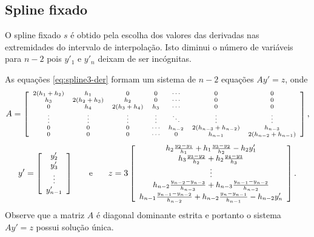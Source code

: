\subsection{Spline fixado}

O spline fixado $s$ é obtido pela escolha dos valores das derivadas nas extremidades do intervalo de interpolação. Isto diminui o número de variáveis para $n-2$ pois $y'_1$ e $y'_n$ deixam de ser incógnitas.

As equações \eqref{eq:spline3-der} formam um sistema de $n-2$ equações $Ay' = z$, onde
\begin{equation*}
	\begin{scriptsize}
A=\left[\begin{array}{ccccccc}
2(h_1+h_2)&h_1&0&0 &\cdots&0&0\\
h_3&2(h_2+h_3)&h_2&0&\cdots&0&0\\
0&h_4&2(h_3+h_4)&h_3&\cdots&0&0\\
\vdots&\vdots&\vdots&\vdots&\ddots&\vdots&\vdots\\
0&0&0&\cdots&h_{n-2} & 2(h_{n-3}+h_{n-2})&h_{n-3}\\
0&0&0&\cdots &0&h_{n-1}&2(h_{n-2}+h_{n-1})
\end{array}\right],
\end{scriptsize} 
\end{equation*}
\begin{equation*}
	\begin{small}
y'= \left[\begin{array}{c}
y'_2\\
y'_3\\
\vdots\\
y'_{n-1}
\end{array}\right]\qquad \text{e}\qquad
z = 3\left[\begin{array}{c}
	h_2\frac{y_2-y_1}{h_1}+h_1\frac{y_3-y_2}{h_2}-h_2y'_1\\
	h_3\frac{y_3-y_2}{h_2}+h_2\frac{y_4-y_3}{h_3}\\
	\vdots\\
	h_{n-2}\frac{y_{n-2}-y_{n-3}}{h_{n-3}}+h_{n-3}\frac{y_{n-1}-y_{n-2}}{h_{n-2}}\\
	h_{n-1}\frac{y_{n-1}-y_{n-2}}{h_{n-2}}+h_{n-2}\frac{y_n-y_{n-1}}{h_{n-1}}-h_{n-2}y'_n
\end{array}\right].
\end{small}
\end{equation*}
Observe que a matriz $A$ é diagonal dominante estrita e portanto o sistema $Ay' = z$ possui solução única.

